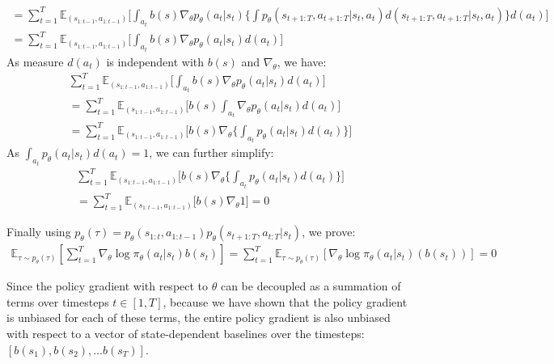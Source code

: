 \documentclass[12pt]{article}
\begin{document}
\begin{enumerate} [label=(\alph*)]
\begin{enumerate}[label=(\alph*)]
\begin{multline}
= \sum_{t=1}^T \mathbb{E}_{(s_{1:t-1},a_{1:t-1}) } \lbrack \int_{a_t}  b(s) \nabla_\theta p_\theta(a_t|s_t) \lbrace \int  p_\theta(s_{t+1:T}, a_{t+1:T} | s_t, a_t ) d(s_{t+1:T}, a_{t+1:T} | s_t, a_t)\rbrace d(a_t)\rbrack \\
=  \sum_{t=1}^T \mathbb{E}_{(s_{1:t-1},a_{1:t-1}) } \lbrack \int_{a_t}  b(s) \nabla_\theta p_\theta(a_t|s_t)  d(a_t)\rbrack
\end{multline}
As measure $d(a_t)$ is independent with $b(s)$ and $\nabla_{\theta}$, we have:
 \begin{multline}
\sum_{t=1}^T \mathbb{E}_{(s_{1:t-1},a_{1:t-1}) } \lbrack \int_{a_t}  b(s) \nabla_\theta p_\theta(a_t|s_t)  d(a_t)\rbrack \\
= \sum_{t=1}^T \mathbb{E}_{(s_{1:t-1},a_{1:t-1}) } \lbrack b(s) \int_{a_t}  \nabla_\theta p_\theta(a_t|s_t)  d(a_t)\rbrack \\
= \sum_{t=1}^T \mathbb{E}_{(s_{1:t-1},a_{1:t-1}) } \lbrack b(s) \nabla_\theta \lbrace \int_{a_t}   p_\theta(a_t|s_t)  d(a_t) \rbrace \rbrack
\end{multline}
As $\int_{a_t}   p_\theta(a_t|s_t)  d(a_t) = 1$, we can further simplify:
 \begin{multline}
\sum_{t=1}^T \mathbb{E}_{(s_{1:t-1},a_{1:t-1}) } \lbrack b(s) \nabla_\theta \lbrace \int_{a_t}   p_\theta(a_t|s_t)  d(a_t) \rbrace \rbrack \\
= \sum_{t=1}^T \mathbb{E}_{(s_{1:t-1},a_{1:t-1}) } \lbrack b(s) \nabla_\theta 1 \rbrack = 0
\end{multline}

Finally using $p_\theta(\tau) = p_\theta(s_{1:t}, a_{1:t-1}) p_\theta(s_{t+1:T}, a_{t:T} | s_t)$, we prove:
\begin{multline}
\mathbb{E}_{\tau \sim p_\theta(\tau)} \left[\sum_{t=1}^T \nabla_\theta \log \pi_\theta(a_t|s_t) b(s_t)\right] = \sum_{t=1}^T \mathbb{E}_{\tau \sim p_\theta(\tau)}\left[ \nabla_\theta \log \pi_\theta(a_t|s_t) \left(b(s_t)\right)\right] = 0
\end{multline}

\end{enumerate}

\end{enumerate}

Since the policy gradient with respect to $\theta$ can be decoupled as a summation of terms over timesteps $t \in [1, T]$, because we have shown that the policy gradient is unbiased for each of these terms,
the entire policy gradient is also unbiased with respect to a vector of state-dependent baselines over the timesteps: $[b(s_1), b(s_2), ... b(s_T)]$.
\end{document}
